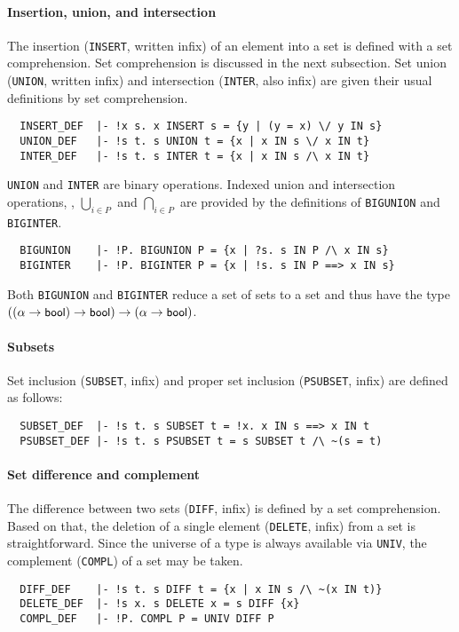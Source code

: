 \paragraph{Insertion, union, and intersection}

The insertion ({\small\verb+INSERT+}, written infix) of an element
into a set is defined with a set comprehension. Set comprehension is
discussed in the next subsection. Set union ({\small\verb+UNION+},
written infix) and intersection ({\small\verb+INTER+}, also infix)
are given their usual definitions by set comprehension.
%
{\small
\begin{verbatim}
  INSERT_DEF  |- !x s. x INSERT s = {y | (y = x) \/ y IN s}
  UNION_DEF   |- !s t. s UNION t = {x | x IN s \/ x IN t}
  INTER_DEF   |- !s t. s INTER t = {x | x IN s /\ x IN t}
\end{verbatim}
}
%
{\small\verb+UNION+} and {\small\verb+INTER+} are binary
operations. Indexed union and intersection operations, \ie,
$\bigcup_{i \in P}$ and $\bigcap_{i \in P}$ are provided by the
definitions of  {\small\verb+BIGUNION+} and {\small\verb+BIGINTER+}.
{\small
\begin{verbatim}
  BIGUNION    |- !P. BIGUNION P = {x | ?s. s IN P /\ x IN s}
  BIGINTER    |- !P. BIGINTER P = {x | !s. s IN P ==> x IN s}
\end{verbatim}
}
%
Both {\small\verb+BIGUNION+} and {\small\verb+BIGINTER+} reduce
a set of sets to a set and thus have the type
$((\alpha\to\mbox{\small{\textbf{\sf{bool}}}})\to\mbox{\small{\textbf{\sf{bool}}}})\to (\alpha\to\mbox{\small{\textbf{\sf{bool}}}})$.

\paragraph{Subsets}

Set inclusion ({\small\verb+SUBSET+}, infix) and proper set inclusion
({\small\verb+PSUBSET+}, infix) are defined as follows:
%
{\small
\begin{verbatim}
  SUBSET_DEF  |- !s t. s SUBSET t = !x. x IN s ==> x IN t
  PSUBSET_DEF |- !s t. s PSUBSET t = s SUBSET t /\ ~(s = t)
\end{verbatim}
}

\paragraph{Set difference and complement}

The difference between two sets ({\small\verb+DIFF+}, infix) is
defined by a set comprehension. Based on that, the deletion of a
single element ({\small\verb+DELETE+}, infix) from a set is
straightforward. Since the universe of a type is always available via
{\small\verb+UNIV+}, the complement ({\small\verb+COMPL+}) of a set
may be taken.
{\small
\begin{verbatim}
  DIFF_DEF    |- !s t. s DIFF t = {x | x IN s /\ ~(x IN t)}
  DELETE_DEF  |- !s x. s DELETE x = s DIFF {x}
  COMPL_DEF   |- !P. COMPL P = UNIV DIFF P
\end{verbatim}
}
%
